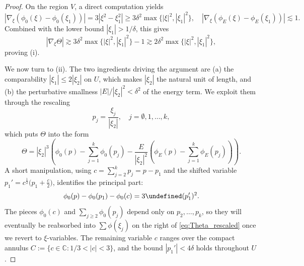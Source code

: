 \documentclass[a4paper,
11pt,  reqno]{amsart}
\newcommand{\5}{\textup{V}}
\newcommand{\noi}{\noindent}
\theoremstyle{remark}
\newcommand{\CC}{\mathbb{C}}
\let\Re=\undefined\DeclareMathOperator*{\Re}{Re}
\numberwithin{equation}{section}
\numberwithin{theorem}{section}
\begin{document}
\begin{proof}
On the region $V$, a direct computation yields
$$
|\nabla_\xi (\phi_0(\xi)-\phi_0(\xi_1))| = 3|\xi^2-\xi_1^2|\ge 3\delta^2\max\{|\xi|^2,|\xi_1|^2\},\quad |\nabla_\xi (\phi_E(\xi)-\phi_E(\xi_1))|\lesssim 1.
$$
Combined with the lower bound $|\xi_1|>1/\delta$, this gives
$$
|\nabla_{\xi} \Theta|\gtrsim 3\delta^2\max\{|\xi|^2,|\xi_1|^2\} - 1 \gtrsim 2\delta^2\max\{|\xi|^2,|\xi_1|^2\},
$$
proving (i).

\noi We now turn to (ii). The two ingredients driving the argument are (a) the comparability $|\xi_1|\le 2|\xi_2|$ on $U$, which makes $|\xi_2|$ the natural unit of length, and (b) the perturbative smallness $|E|/|\xi_2|^2<\delta^2$ of the energy term. We exploit them through the rescaling
$$
p_j=\frac{\xi_j}{|\xi_2|},\quad j=\emptyset, 1,\dots, k,
$$
which puts $\Theta$ into the form
\begin{equation}\label{eq:Theta_rescaled}
\Theta=|\xi_2|^3\left(\phi_0(p) - \sum_{j=1}^k \phi_0(p_j) - \frac{E}{|\xi_2|^2}\left(\phi_E(p) - \sum_{j=1}^k \phi_E(p_j)\right)\right).
\end{equation}
A short manipulation, using $c=\sum_{j=2}^k p_j=p-p_1$ and the shifted variable $p_1'=c^{\frac12}\bigl(p_1+\tfrac{c}{2}\bigr)$, identifies the principal part:
$$
\phi_0(p)-\phi_0(p_1) - \phi_0(c) = 3\Re (p_1')^2.
$$
The pieces $\phi_0(c)$ and $\sum_{j\ge 2}\phi_0(p_j)$ depend only on $p_2,\dots,p_k$, so they will eventually be reabsorbed into $\sum \phi(\xi_j)$ on the right of \eqref{eq:Theta_rescaled} once we revert to $\xi$-variables. The remaining variable $c$ ranges over the compact annulus $C:=\{c\in\CC: 1/3<|c|<3\}$, and the bound $|p_1'|<4\delta$ holds throughout $U$.


\end{proof}
\end{document}
